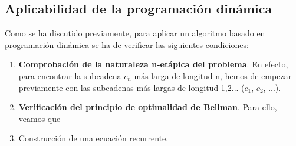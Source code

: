 
\subsection{Aplicabilidad de la programación dinámica}

Como se ha discutido previamente, para aplicar un algoritmo basado en programación
dinámica se ha de verificar las siguientes condiciones:

\begin{enumerate}
    \item \textbf{Comprobación de la naturaleza n-etápica del problema}. En efecto, 
    para encontrar la subcadena $c_n$ más larga de longitud n, hemos de empezar 
    previamente con las subcadenas más largas de longitud 1,2... ($c_1$, $c_2$, ...). 

    \item \textbf{Verificación del principio de optimalidad de Bellman}. Para ello, 
    veamos que 
    \item Construcción de una ecuación recurrente. 
\end{enumerate}





